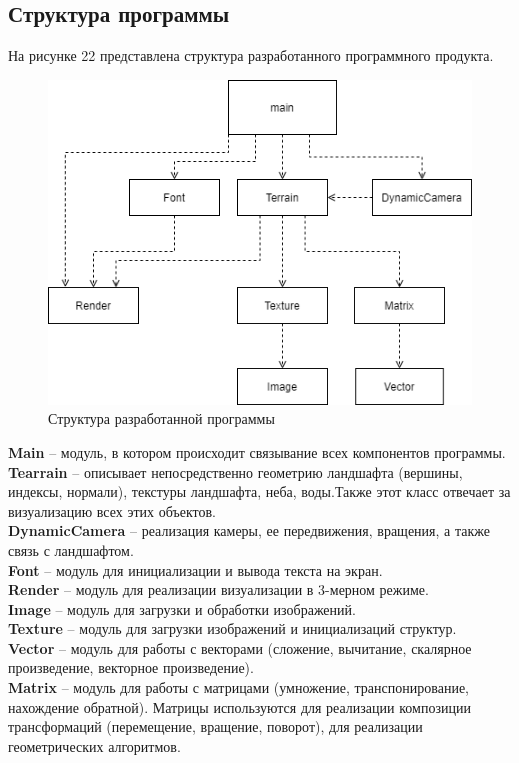 \documentclass[a4paper, 10pt]{article}
\begin{document}
	\subsection{Структура программы}
	\hspace*{5mm} На рисунке 22 представлена структура разработанного программного продукта.
	\clearpage
	\newpage
	\begin{figure}[h!]
		\centering
		\includegraphics[scale=0.8]{schema}
		\centering\caption{Структура разработанной программы}
	\end{figure}
	\textbf{Main} – модуль, в котором происходит связывание всех компонентов программы.
	\\ \textbf{Tearrain} – описывает непосредственно геометрию ландшафта (вершины, индексы, нормали), текстуры ландшафта, неба, воды.Также этот класс отвечает за визуализацию всех этих объектов. 
	\\ \textbf{DynamicCamera} – реализация камеры, ее передвижения, вращения, а также связь с ландшафтом.
	\\ \textbf{Font} – модуль для инициализации и вывода текста на экран.
	\\ \textbf{Render} – модуль для реализации визуализации в 3-мерном режиме.
	\\ \textbf{Image} – модуль для загрузки и обработки изображений.
	\\ \textbf{Texture} – модуль для загрузки изображений и инициализаций структур.
	\\ \textbf{Vector} – модуль для работы с векторами (сложение, вычитание, скалярное произведение, векторное произведение).
	\\ \textbf{Matrix} – модуль для работы с матрицами (умножение, транспонирование, нахождение обратной). Матрицы используются для реализации композиции трансформаций (перемещение, вращение, поворот), для реализации геометрических алгоритмов.
\end{document}

